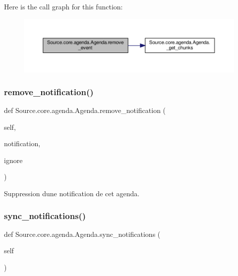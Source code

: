 Here is the call graph for this function\+:
\nopagebreak
\begin{figure}[H]
\begin{center}
\leavevmode
\includegraphics[width=350pt]{classSource_1_1core_1_1agenda_1_1Agenda_a2a56040b52078f048e1ce04a647b3ad5_cgraph}
\end{center}
\end{figure}
\mbox{\label{classSource_1_1core_1_1agenda_1_1Agenda_a34ea6d5e23cfc5aeb271ba1d2b1eb9c4}} 
\subsubsection{\texorpdfstring{remove\+\_\+notification()}{remove\_notification()}}
{\footnotesize\ttfamily def Source.\+core.\+agenda.\+Agenda.\+remove\+\_\+notification (\begin{DoxyParamCaption}\item[{}]{self,  }\item[{}]{notification,  }\item[{}]{ignore }\end{DoxyParamCaption})}



Suppression d\textquotesingle{}une notification de cet agenda. 

\mbox{\label{classSource_1_1core_1_1agenda_1_1Agenda_a49963bf70decca8bf319f4487ff90e47}} 
\subsubsection{\texorpdfstring{sync\+\_\+notifications()}{sync\_notifications()}}
{\footnotesize\ttfamily def Source.\+core.\+agenda.\+Agenda.\+sync\+\_\+notifications (\begin{DoxyParamCaption}\item[{}]{self }\end{DoxyParamCaption})}



